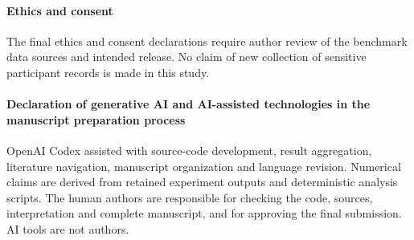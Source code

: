 \documentclass[5p,times,twocolumn]{elsarticle}
\theoremstyle{plain}
\theoremstyle{definition}
\theoremstyle{remark}
\begin{document}
\par\endgroup
\paragraph{\textcolor{RevisionRed}{Ethics and consent}}
\begingroup\color{RevisionRed}
The final ethics and consent declarations require author review of the benchmark data sources and intended release. No claim of new collection of sensitive participant records is made in this study.

\par\endgroup
\paragraph{\textcolor{RevisionRed}{Declaration of generative AI and AI-assisted technologies in the manuscript preparation process}}
\begingroup\color{RevisionRed}
OpenAI Codex assisted with source-code development, result aggregation, literature navigation, manuscript organization and language revision. Numerical claims are derived from retained experiment outputs and deterministic analysis scripts. The human authors are responsible for checking the code, sources, interpretation and complete manuscript, and for approving the final submission. AI tools are not authors.


\par\endgroup


\end{document}
